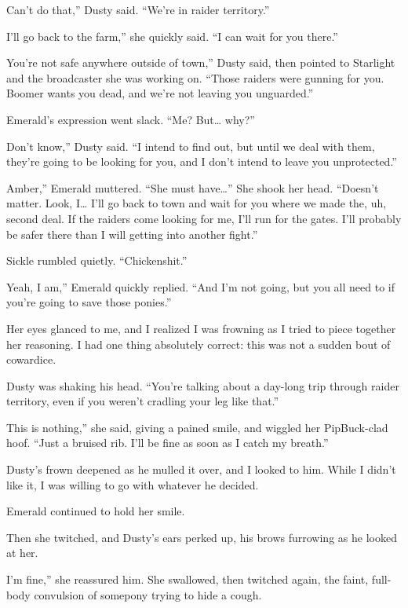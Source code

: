 \leavevmode{}Can’t do that,” Dusty said. “We’re in raider territory.”

\leavevmode{}I’ll go back to the farm,” she quickly said. “I can wait for you there.”

\leavevmode{}You’re not safe anywhere outside of town,” Dusty said, then pointed to Starlight and the broadcaster she was working on. “Those raiders were gunning for you. Boomer wants you dead, and we’re not leaving you unguarded.”

Emerald’s expression went slack. “Me? But… why?”

\leavevmode{}Don’t know,” Dusty said. “I intend to find out, but until we deal with them, they’re going to be looking for you, and I don’t intend to leave you unprotected.”

\leavevmode{}Amber,” Emerald muttered. “She must have…” She shook her head. “Doesn’t matter. Look, I… I’ll go back to town and wait for you where we made the, uh, second deal. If the raiders come looking for me, I’ll run for the gates. I’ll probably be safer there than I will getting into another fight.”

Sickle rumbled quietly. “Chickenshit.”

\leavevmode{}Yeah, I am,” Emerald quickly replied. “And I’m not going, but you all need to if you’re going to save those ponies.”

Her eyes glanced to me, and I realized I was frowning as I tried to piece together her reasoning. I had one thing absolutely correct: this was not a sudden bout of cowardice.

Dusty was shaking his head. “You’re talking about a day-long trip through raider territory, even if you weren’t cradling your leg like that.”

\leavevmode{}This is nothing,” she said, giving a pained smile, and wiggled her PipBuck-clad hoof. “Just a bruised rib. I’ll be fine as soon as I catch my breath.”

Dusty’s frown deepened as he mulled it over, and I looked to him. While I didn’t like it, I was willing to go with whatever he decided.

Emerald continued to hold her smile.

Then she twitched, and Dusty’s ears perked up, his brows furrowing as he looked at her.

\leavevmode{}I’m fine,” she reassured him. She swallowed, then twitched again, the faint, full-body convulsion of somepony trying to hide a cough.

